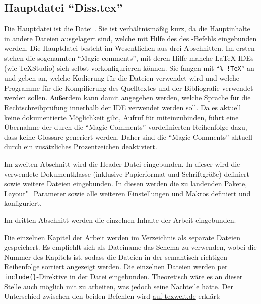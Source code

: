 \subsection[Hauptdatei \enquote{Diss.tex}]{Hauptdatei \enquote{Diss.tex}}%
%
\label{sec:Hauptdatei}
%
Die Hauptdatei ist die Datei .
Sie ist verhältnismäßig kurz, da die Hauptinhalte in andere Dateien ausgelagert sind, welche mit Hilfe des  \bzw des -Befehls eingebunden werden.
Die Hauptdatei besteht im Wesentlichen aus drei Abschnitten.
Im ersten stehen die sogenannten \enquote{Magic comments}, mit deren Hilfe manche \LaTeX-IDEs (wie \zB TeXStudio) sich selbst vorkonfigurieren können.
Sie fangen mit \enquote{\texttt{\%~!TeX}} an und geben an, welche Kodierung für die Dateien verwendet wird und welche Programme für die Kompilierung des Quelltextes und der Bibliografie verwendet werden sollen.
Außerdem kann damit angegeben werden, welche Sprache für die Rechtschreibprüfung innerhalb der IDE verwendet werden soll.
Da es aktuell keine dokumentierte Möglichkeit gibt, Aufruf für  miteinzubinden,
führt eine Übernahme der durch die \enquote{Magic Comments} vordefinierten Reihenfolge dazu, dass keine Glossare generiert werden.
Daher sind die \enquote{Magic Comments} aktuell durch ein zusätzliches Prozentzeichen deaktiviert.

Im zweiten Abschnitt wird die Header-Datei eingebunden.
In dieser wird die verwendete Dokumentklasse (inklusive Papierformat und Schriftgröße) definiert sowie weitere Dateien eingebunden.
In diesen werden die zu landenden Pakete, Layout"=Parameter sowie alle weiteren Einstellungen und Makros definiert und konfiguriert.

Im dritten Abschnitt werden die einzelnen Inhalte der Arbeit eingebunden.

Die einzelnen Kapitel der Arbeit werden im Verzeichnis  als separate Dateien gespeichert.
Es empfiehlt sich als Dateiname das Schema  zu verwenden, wobei  die Nummer des Kapitels ist,
sodass die Dateien in der semantisch richtigen Reihenfolge sortiert angezeigt werden.
Die einzelnen Dateien werden per \verb+include{}+-Direktive in der Datei  eingebunden.
Theoretisch wäre es an dieser Stelle auch möglich mit \verb++ zu arbeiten, was jedoch seine Nachteile hätte.
Der Unterschied zwischen den beiden Befehlen wird \href{https://texwelt.de/wissen/fragen/32/was-ist-der-unterschied-zwischen-include-and-input}{auf texwelt.de} erklärt:

